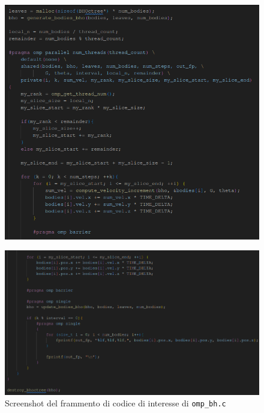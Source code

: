 \documentclass[12pt]{report}
\begin{document}
    \begin{figure}[H]
        \centering
        \includegraphics[width=\textwidth]{images/omp_bh_1.png}
    \end{figure}
    \begin{figure}[H]
        \centering
        \includegraphics[width=\textwidth]{images/omp_bh_2.png}
        \caption{Screenshot del frammento di codice di interesse di \texttt{omp\_bh.c}}
        \label{fig:omp_bh}
    \end{figure}
\end{document}

